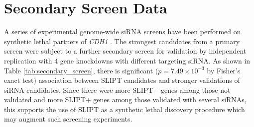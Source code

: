 

\chapter{Secondary Screen Data}
\label{appendix:secondary_screen}

A series of experimental genome-wide siRNA screens have been performed on synthetic lethal partners of \textit{CDH1} \citep{Telford2015}. The strongest candidates from a primary screen were subject to a further secondary screen for validation by independent replication with 4 gene knockdowns with different targeting siRNA. As shown in Table \ref{tab:secondary_screen}, there is significant ($p=7.49 \times 10^{-3}$ by Fisher's exact test) %
association between SLIPT candidates and stronger validations of siRNA candidates. Since there were more SLIPT$-$ genes among those not validated and more SLIPT$+$ genes among those validated with several siRNAs, this supports the use of SLIPT as a synthetic lethal discovery procedure which may augment such screening experiments.

